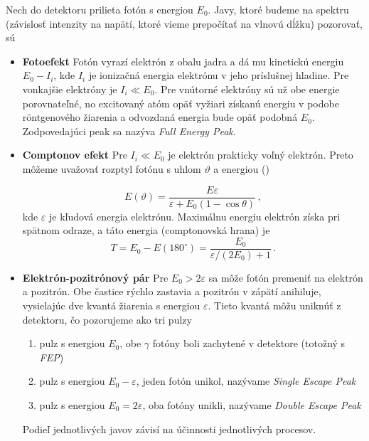 \documentclass[a4paper, 10pt]{article}
\begin{document}
Nech do detektoru prilieta fotón s energiou $E_0$. Javy, ktoré budeme na spektru (závislosť intenzity na napätí, ktoré vieme prepočítať na vlnovú dĺžku) pozorovať, sú
\begin{itemize}
	\item \textbf{Fotoefekt} Fotón vyrazí elektrón z obalu jadra a dá mu kinetickú energiu $E_0 - I_i$, kde $I_i$ je ionizačná energia elektrónu v jeho príslušnej hladine. Pre vonkajšie elektróny je $I_i \ll E_0$. Pre vnútorné elektróny sú už obe energie porovnateľné, no excitovaný atóm opäť vyžiari získanú energiu v podobe r\"ontgenového žiarenia a odvozdaná energia bude opäť podobná $E_0$. Zodpovedajúci peak sa nazýva \textit{Full Energy Peak}.
	\item \textbf{Comptonov efekt} Pre $I_i \ll E_0$ je elektrón prakticky voľný elektrón. Preto môžeme uvažovať rozptyl fotónu s uhlom $\vartheta$ a energiou (\cite{stud})

    \begin{equation}
    \label{eq:teor:compton}
    E(\vartheta) = \frac{E\varepsilon}{\varepsilon + E_0 (1-\cos\theta)}\,,
    \end{equation}
    kde $\varepsilon$ je kľudová energia elektrónu. Maximálnu energiu elektrón získa pri spätnom odraze, a táto energia (comptonovská hrana) je 
    \begin{equation}
    \label{eq:teor:compton:max}
    T = E_0 - E(180^\circ) = \frac{E_0}{\varepsilon/(2E_0) + 1}\,.
    \end{equation}
    
    \item \textbf{Elektrón-pozitrónový pár} Pre $E_0 > 2\varepsilon$ sa môže fotón premeniť na elektrón a pozitrón. Obe častice rýchlo zastavia a pozitrón v zápätí anihiluje, vysielajúc dve kvantá žiarenia s energiou $\varepsilon$. Tieto kvantá môžu uniknúť z detektoru, čo pozorujeme ako tri pulzy
    \begin{enumerate}
        \item pulz s energiou $E_0$, obe $\gamma$ fotóny boli zachytené v detektore (totožný s \textit{FEP})
        \item pulz s energiou $E_0 - \varepsilon$, jeden fotón unikol, nazývame \textit{Single Escape Peak}
        \item pulz s energiou $E_0 = 2\varepsilon$, oba fotóny unikli, nazývame \textit{Double Escape Peak}
    \end{enumerate}
    Podieľ jednotlivých javov závisí na účinnosti jednotlivých procesov.
    

\end{itemize}
\end{document}
